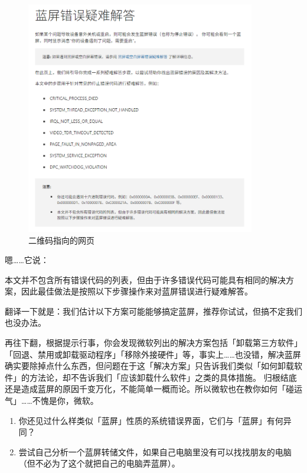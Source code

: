 \begin{figure}[htb!]
  \centering
  \includegraphics[width=10cm]{assets/Stopcode-Webpage.png}
  \caption{二维码指向的网页}
  \label{Stopcode-Webpage}
\end{figure}

嗯……它说：

\begin{note}
  本文并不包含所有错误代码的列表，但由于许多错误代码可能具有相同的解决方案，因此最佳做法是按照以下步骤操作来对蓝屏错误进行疑难解答。
\end{note}

翻译一下就是：我们估计以下方案可能能够搞定蓝屏，推荐你试试，但搞不定我们也没办法。

再往下翻，根据提示行事，你会发现微软列出的解决方案包括「卸载第三方软件」「回退、禁用或卸载驱动程序」「移除外接硬件」等，事实上……也没错，解决蓝屏确实要除掉点什么东西，但问题在于这「解决方案」只告诉我们类似「如何卸载软件」的方法论，却不告诉我们「应该卸载什么软件」之类的具体措施。
归根结底还是造成蓝屏的原因千变万化，不能简单一概而论。所以微软也在教你如何「碰运气」……不愧是你，微软。

\practice

\begin{enumerate}
  \item 你还见过什么样类似「蓝屏」性质的系统错误界面，它们与「蓝屏」有何异同？
  \item 尝试自己分析一个蓝屏转储文件，如果自己电脑里没有可以找找朋友的电脑（但不必为了这个就把自己的电脑弄蓝屏）。
\end{enumerate}